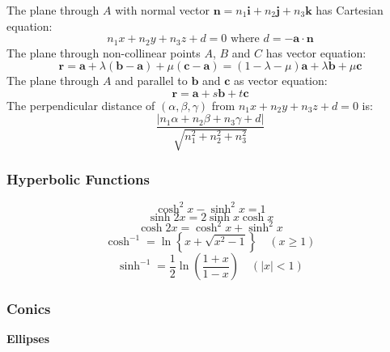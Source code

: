 \documentclass{book}
\begin{document}
            The plane through $A$ with normal vector $\textbf{n}=n_1\textbf{i}+n_2\textbf{j}+n_3\textbf{k}$ has Cartesian equation:
            \begin{equation}
                n_1x+n_2y+n_3z+d=0\text{ where }d=-\textbf{a}\cdot\textbf{n}
            \end{equation}
            The plane through non-collinear points $A$, $B$ and $C$ has vector equation:
            \begin{equation}
                \textbf{r}=\textbf{a}+\lambda(\textbf{b}-\textbf{a})+\mu(\textbf{c}-\textbf{a})=(1-\lambda-\mu)\textbf{a}+\lambda\textbf{b}+\mu\textbf{c}
            \end{equation}
            The plane through $A$ and parallel to $\textbf{b}$ and $\textbf{c}$ as vector equation:
            \begin{equation}
                \textbf{r}=\textbf{a}+s\textbf{b}+t\textbf{c}
            \end{equation}
            The perpendicular distance of $(\alpha,\beta,\gamma)$ from $n_1x+n_2y+n_3z+d=0$ is:
            \begin{equation}
                \frac{|n_1\alpha+n_2\beta+n_3\gamma+d|}{\sqrt{n_1^2+n_2^2+n_3^2}}
            \end{equation}

            \subsubsection{Hyperbolic Functions}
            \begin{equation}
                \cosh^2x-\sinh^2x=1
            \end{equation}
            \begin{equation}
                \sinh2x=2\sinh x\cosh x
            \end{equation}
            \begin{equation}
                \cosh2x=\cosh^2x+\sinh^2x
            \end{equation}
            \begin{equation}
                \cosh^{-1}=\ln\left\{x+\sqrt{x^2-1}\right\}\quad{(x\ge1)}
            \end{equation}
            \begin{equation}
                \sinh^{-1}=\frac{1}{2}\ln\left(\frac{1+x}{1-x}\right)\quad{(|x|<1)}
            \end{equation}

            \subsubsection{Conics}
            \noindent\textbf{Ellipses} \\
\end{document}
